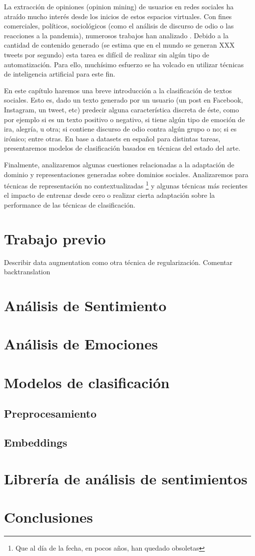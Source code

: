 La extracción de opiniones (opinion mining) de usuarios en redes sociales ha atraído mucho interés desde los inicios de estos espacios virtuales. Con fines comerciales, políticos, sociológicos (como el análisis de discurso de odio o las reacciones a la pandemia), numerosos trabajos han analizado . Debido a la cantidad de contenido generado (se estima que en el mundo se generan XXX tweets por segundo) esta tarea es difícil de realizar sin algún tipo de automatización. Para ello, muchísimo esfuerzo se ha volcado en utilizar técnicas de inteligencia artificial para este fin.

En este capítulo haremos una breve introducción a la clasificación de textos sociales. Esto es, dado un texto generado por un usuario (un post en Facebook, Instagram, un tweet, etc) predecir alguna característica discreta de éste, como por ejemplo si es un texto positivo o negativo, si tiene algún tipo de emoción de ira, alegría, u otra; si contiene discurso de odio contra algún grupo o no; si es irónico; entre otras. En base a datasets en español para distintas tareas, presentaremos modelos de clasificación basados en técnicas del estado del arte.

Finalmente, analizaremos algunas cuestiones relacionadas a la adaptación de dominio y representaciones generadas sobre dominios sociales. Analizaremos para técnicas de representación no contextualizadas \footnote{Que al día de la fecha, en pocos años, han quedado obsoletas} y algunas técnicas más recientes el impacto de entrenar desde cero o realizar cierta adaptación sobre la performance de las técnicas de clasificación.

\section{Trabajo previo}

Describir data augmentation como otra técnica de regularización. Comentar backtranslation

\section{Análisis de Sentimiento}

\section{Análisis de Emociones}

\section{Modelos de clasificación}
\subsection{Preprocesamiento}
\subsection{Embeddings}


\section{Librería de análisis de sentimientos}

\section{Conclusiones}